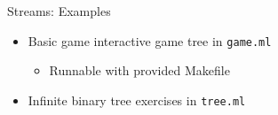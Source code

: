 \documentclass{beamer}
\newcommand{\code}[1]{\texttt{#1}}
\begin{document}
    \begin{frame}{Streams: Examples}
        \begin{itemize}
            \item<1-> Basic game interactive game tree in \code{game.ml}
            \begin{itemize}
                \item<2-> Runnable with provided Makefile
            \end{itemize}
            \item<3-> Infinite binary tree exercises in \code{tree.ml}
        \end{itemize}
    \end{frame}
\end{document}
